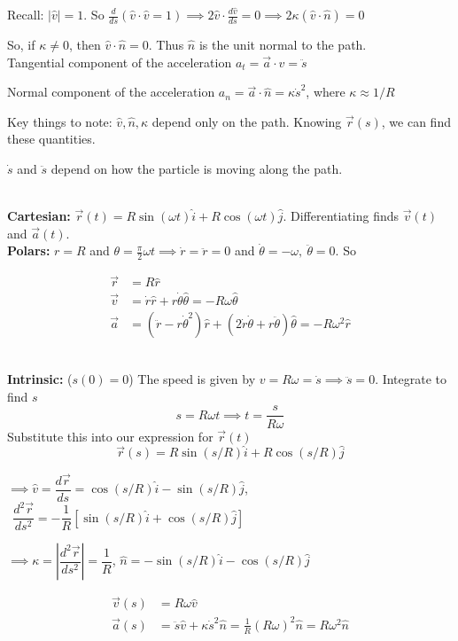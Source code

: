 Recall: $|\hat{v}| = 1$. So $\frac{d}{ds}(\hat{v}\cdot\hat{v} = 1) \implies 2\hat{v}\cdot\frac{d\hat{v}}{ds} = 0 \implies 2\kappa(\hat{v}\cdot\hat{n}) = 0$

So, if $\kappa \neq 0$, then $\hat{v}\cdot \hat{n} = 0$. Thus $\hat{n}$ is the unit normal to the path.\\

Tangential component of the acceleration $a_t = \vec{a}\cdot\hat{v} = \ddot{s}$

Normal component of the acceleration $a_n = \vec{a}\cdot\hat{n} = \kappa \dot{s}^2$, where $\kappa \approx 1/R$
\vspace*{100pt}

Key things to note: $\hat{v}, \hat{n}, \kappa$ depend only on the path. Knowing $\vec{r}(s)$, we can find these 	quantities. 

$\dot{s}$ and $\ddot{s}$ depend on how the particle is moving along the path.\\


\begin{example}~\\

\textbf{Cartesian:}
$\vec{r}(t) = R\sin(\omega t)\hat{i} + R\cos(\omega t)\hat{j}$.
Differentiating finds $\vec{v}(t)$ and $\vec{a}(t)$.\\

\textbf{Polars:} 
$r = R$ and $\theta = \frac{\pi}{2} \omega t \implies \dot{r} = \ddot{r} = 0$ and $ \dot{\theta} = -\omega,~\ddot{\theta} = 0$. So 

\[\begin{aligned}
	\vec{r} &= R\hat{r}\\
 \vec{v} &= \dot{r}\hat{r} + r\dot{\theta}\hat{\theta} = -R\omega\hat{\theta}\\
\vec{a} &= (\ddot{r} - r\dot{\theta}^2)\hat{r} + (2\dot{r}\dot{\theta} + r\ddot{\theta})\hat{\theta} = -R\omega^2\hat{r}
\end{aligned}
\]~

\textbf{Intrinsic:} ($s(0) = 0$) The speed is given by $v = R\omega = \dot{s} \implies \ddot{s} = 0$. Integrate to find $s$
\[s = R\omega t \implies t= \frac{s}{R\omega}\]
Substitute this into our expression for $\vec{r}(t)$
\[\vec{r}(s) = R\sin(s/R)\hat{i} + R\cos(s/R)\hat{j}\]

$\implies \hat{v} = \dfrac{d\vec{r}}{ds} = \cos(s/R)\hat{i} - \sin(s/R)\hat{j}$,
$~~\dfrac{d^2\vec{r}}{ds^2} = -\dfrac{1}{R}[\sin(s/R)\hat{i} + \cos(s/R)\hat{j}]$

$\implies \kappa = \left|\dfrac{d^2\vec{r}}{ds^2} \right| = \dfrac{1}{R}$, $\hat{n} = -\sin(s/R)\hat{i} - \cos(s/R)\hat{j}$

\[\begin{aligned}
\vec{v}(s) &= R\omega \hat{v}\\
\vec{a}(s) &= \ddot{s}\hat{v} + \kappa \dot{s}^2\hat{n} = \frac{1}{R}(R\omega)^2\hat{n} = R\omega^2\hat{n}
\end{aligned}
\]
\end{example}


